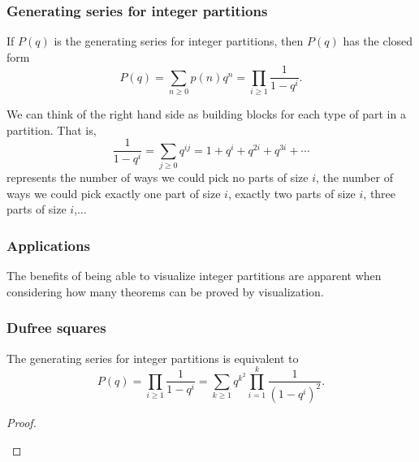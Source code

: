 \documentclass{beamer}
\begin{document}
\begin{frame}
\frametitle{Generating series for integer partitions}

If $P(q)$ is the generating series for integer partitions, then $P(q)$ has the closed form
$$P(q) = \sum_{n\geq0}p(n)q^n = \prod_{i\geq 1}\frac{1}{1-q^i}.$$


We can think of the right hand side as building blocks for each type of part in a partition. That is,
$$\frac{1}{1-q^i} = \sum_{j \geq 0}q^{ij} = 1 + q^i + q^{2i} +q^{3i} +\dotsb $$
represents the number of ways we could pick no parts of size $i$, the number of ways we could pick exactly one part of size $i$, exactly two parts of size $i$, three parts of size $i$,$\ldots$
\end{frame}

\begin{frame}
  \frametitle{Applications}
  The benefits of being able to visualize integer partitions are apparent when considering how many theorems can be proved by visualization.
\end{frame}

\begin{frame}
	\frametitle{Dufree squares}
\begin{theorem}
The generating series for integer partitions is equivalent to
$$P(q) = \prod_{i\geq 1} \frac{1}{1-q^i} = \sum_{k\geq1}q^{k^2}\prod_{i=1}^{k}\frac{1}{(1-q^i)^2}.$$	
\end{theorem}

\begin{proof}
\begin{center}
\end{center}
\end{proof}
\end{frame}
\end{document}
